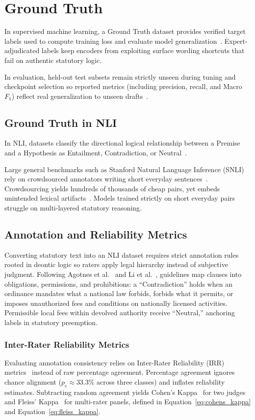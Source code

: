 \section{Ground Truth}
In supervised machine learning, a Ground Truth dataset provides verified target labels used to compute training loss and evaluate model generalization~\cite{goodfellow2016deep}. Expert-adjudicated labels keep encoders from exploiting surface wording shortcuts that fail on authentic statutory logic.

In evaluation, held-out test subsets remain strictly unseen during tuning and checkpoint selection so reported metrics (including precision, recall, and Macro $F_1$) reflect real generalization to unseen drafts~\cite{bowman2015snli}.

    \subsection{Ground Truth in NLI}
    In NLI, datasets classify the directional logical relationship between a Premise and a Hypothesis as Entailment, Contradiction, or Neutral~\cite{yang2024improving}.

    Large general benchmarks such as Stanford Natural Language Inference (SNLI) rely on crowdsourced annotators writing short everyday sentences~\cite{bowman2015snli}. Crowdsourcing yields hundreds of thousands of cheap pairs, yet embeds unintended lexical artifacts~\cite{gururangan2018annotation}. Models trained strictly on short everyday pairs struggle on multi-layered statutory reasoning.

    \subsection{Annotation and Reliability Metrics}
    Converting statutory text into an NLI dataset requires strict annotation rules rooted in deontic logic so raters apply legal hierarchy instead of subjective judgment. Following Agotnes et al.~\cite{agotnes2007on} and Li et al.~\cite{li2012detecting}, guidelines map clauses into obligations, permissions, and prohibitions: a ``Contradiction'' holds when an ordinance mandates what a national law forbids, forbids what it permits, or imposes unauthorized fees and conditions on nationally licensed activities. Permissible local fees within devolved authority receive ``Neutral,'' anchoring labels in statutory preemption.

        \subsubsection{Inter-Rater Reliability Metrics}
        Evaluating annotation consistency relies on Inter-Rater Reliability (IRR) metrics~\cite{mchugh2012interrater} instead of raw percentage agreement. Percentage agreement ignores chance alignment ($p_e \approx 33.3\%$ across three classes) and inflates reliability estimates. Subtracting random agreement yields Cohen's Kappa~\cite{cohen1960coefficient} for two judges and Fleiss' Kappa~\cite{fleiss1971measuring} for multi-rater panels, defined in Equation~\eqref{eq:cohens_kappa} and Equation~\eqref{eq:fleiss_kappa}.

